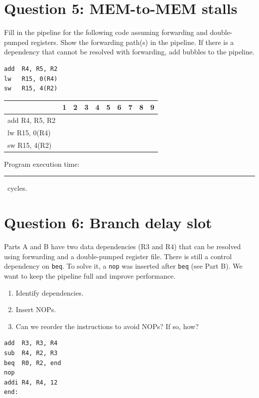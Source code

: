 \documentclass[11pt]{article}
\begin{document}
\newpage
\section*{Question 5: MEM-to-MEM stalls}
Fill in the pipeline for the following code assuming forwarding and double-pumped registers. Show the forwarding path(s) in the pipeline. If there is a dependency that cannot be resolved with forwarding, add bubbles to the pipeline.
\begin{verbatim}
add  R4, R5, R2
lw   R15, 0(R4)
sw   R15, 4(R2)
\end{verbatim}

\bigskip
\begin{tabular}{@{}l|ccccccccc@{}}
\textbf{} & \textbf{1} & \textbf{2} & \textbf{3} & \textbf{4} & \textbf{5} & \textbf{6} & \textbf{7} & \textbf{8} & \textbf{9} \\
\midrule
add  R4, R5, R2  & & & & & & & & & \\
lw   R15, 0(R4)  & & & & & & & & & \\
sw   R15, 4(R2)  & & & & & & & & & \\
\bottomrule
\end{tabular}

\bigskip
Program execution time: \rule{2in}{0.4pt}\, cycles.

\newpage
\section*{Question 6: Branch delay slot}
Parts A and B have two data dependencies (R3 and R4) that can be resolved using forwarding and a double-pumped register file. There is still a control dependency on \texttt{beq}. To solve it, a \texttt{nop} was inserted after \texttt{beq} (see Part B). We want to keep the pipeline full and improve performance.
\begin{enumerate}[label=\Alph*.]
    \item Identify dependencies.
    \item Insert NOPs.
    \item Can we reorder the instructions to avoid NOPs? If so, how?
\end{enumerate}
\begin{verbatim}
add  R3, R3, R4
sub  R4, R2, R3
beq  R0, R2, end
nop
addi R4, R4, 12
end:
\end{verbatim}
\end{document}
